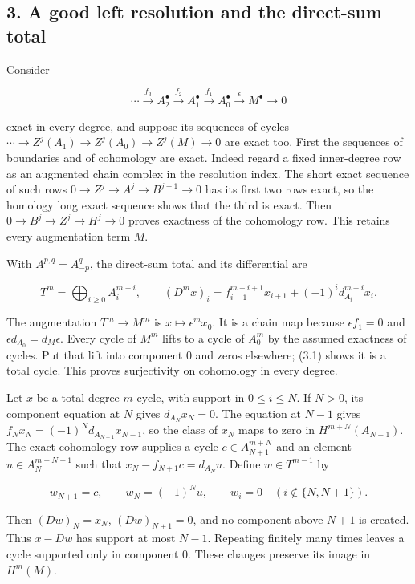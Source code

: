 \documentclass[11pt]{article}
\begin{document}
\subsection{3. A good left resolution and the direct-sum total}\label{note-08-a-good-left-resolution-and-the-direct-sum-total}

Consider

\[
\cdots\xrightarrow{f_3}A_2^\bullet\xrightarrow{f_2}A_1^\bullet
\xrightarrow{f_1}A_0^\bullet\xrightarrow{\epsilon}M^\bullet\to0
\]

exact in every degree, and suppose its sequences of cycles \(\cdots\to Z^j(A_1)\to Z^j(A_0)\to Z^j(M)\to0\) are exact too. First the sequences of boundaries and of cohomology are exact. Indeed regard a fixed inner-degree row as an augmented chain complex in the resolution index. The short exact sequence of such rows \(0\to Z^j\to A^j\to B^{j+1}\to0\) has its first two rows exact, so the homology long exact sequence shows that the third is exact. Then \(0\to B^j\to Z^j\to H^j\to0\) proves exactness of the cohomology row. This retains every augmentation term \(M\).

With \(A^{p,q}=A_{-p}^q\), the direct-sum total and its differential are

\[
T^m=\bigoplus_{i\geq0}A_i^{m+i},\qquad
(D^mx)_i=f_{i+1}^{m+i+1}x_{i+1}+(-1)^i d_{A_i}^{m+i}x_i.       \tag{3.1}
\]

The augmentation \(T^m\to M^m\) is \(x\mapsto\epsilon^m x_0\). It is a chain map because \(\epsilon f_1=0\) and \(\epsilon d_{A_0}=d_M\epsilon\). Every cycle of \(M^m\) lifts to a cycle of \(A_0^m\) by the assumed exactness of cycles. Put that lift into component 0 and zeros elsewhere; (3.1) shows it is a total cycle. This proves surjectivity on cohomology in every degree.

Let \(x\) be a total degree-\(m\) cycle, with support in \(0\leq i\leq N\). If \(N>0\), its component equation at \(N\) gives \(d_{A_N}x_N=0\). The equation at \(N-1\) gives \(f_Nx_N=(-1)^N d_{A_{N-1}}x_{N-1}\), so the class of \(x_N\) maps to zero in \(H^{m+N}(A_{N-1})\). The exact cohomology row supplies a cycle \(c\in A_{N+1}^{m+N}\) and an element \(u\in A_N^{m+N-1}\) such that \(x_N-f_{N+1}c=d_{A_N}u\). Define \(w\in T^{m-1}\) by

\[
w_{N+1}=c,\qquad w_N=(-1)^N u,
\qquad w_i=0\quad(i\notin\{N,N+1\}).
\]

Then \((Dw)_N=x_N\), \((Dw)_{N+1}=0\), and no component above \(N+1\) is created. Thus \(x-Dw\) has support at most \(N-1\). Repeating finitely many times leaves a cycle supported only in component 0. These changes preserve its image in \(H^m(M)\).
\end{document}
